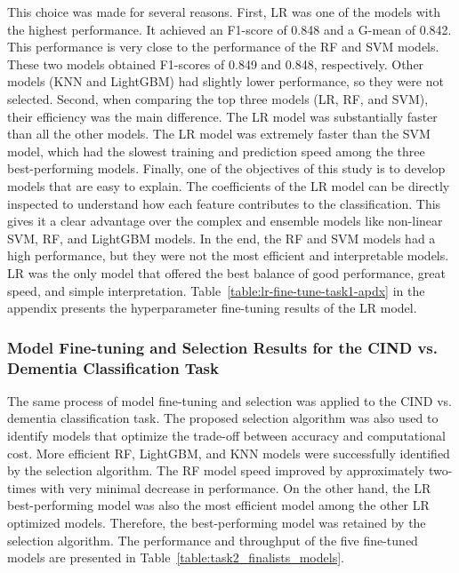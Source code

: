 This choice was made for several reasons. First, LR was one of the models with the highest performance. It achieved an F1-score of 0.848 and a G-mean of 0.842. This performance is very close to the performance of the RF and SVM models. These two models obtained F1-scores of 0.849 and 0.848, respectively. Other models (KNN and LightGBM) had slightly lower performance, so they were not selected. Second, when comparing the top three models (LR, RF, and SVM), their efficiency was the main difference. The LR model was substantially faster than all the other models. The LR model was extremely faster than the SVM model, which had the slowest training and prediction speed among the three best-performing models. Finally, one of the objectives of this study is to develop models that are easy to explain. The coefficients of the LR model can be directly inspected to understand how each feature contributes to the classification. This gives it a clear advantage over the complex and ensemble models like non-linear SVM, RF, and LightGBM models. In the end, the RF and SVM models had a high performance, but they were not the most efficient and interpretable models. LR was the only model that offered the best balance of good performance, great speed, and simple interpretation. Table~\ref{table:lr-fine-tune-task1-apdx} in the appendix presents the hyperparameter fine-tuning results of the LR model.

\subsubsection{Model Fine-tuning and Selection Results for the CIND vs. Dementia Classification Task}
The same process of model fine-tuning and selection was applied to the CIND vs. dementia classification task. The proposed selection algorithm was also used to identify models that optimize the trade-off between accuracy and computational cost. More efficient RF, LightGBM, and KNN models were successfully identified by the selection algorithm. The RF model speed improved by approximately two-times with very minimal decrease in performance. On the other hand, the LR best-performing model was also the most efficient model among the other LR optimized models. Therefore, the best-performing model was retained by the selection algorithm. The performance and throughput of the five fine-tuned models are presented in Table~\ref{table:task2_finalists_models}.


